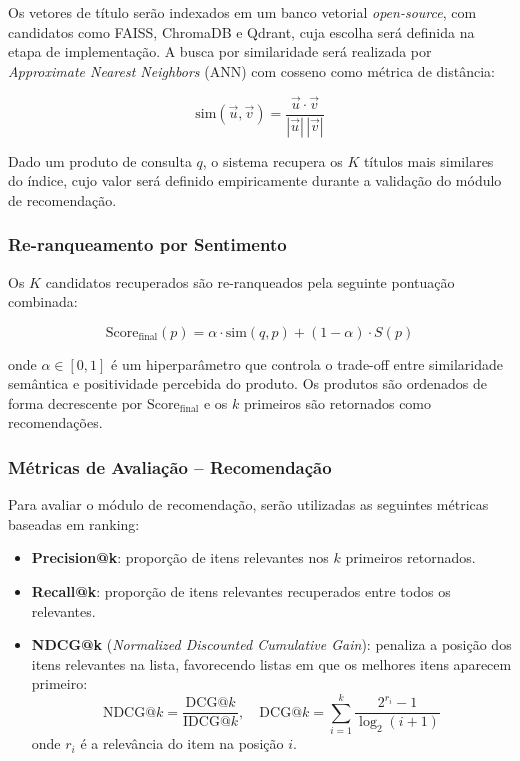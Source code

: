 \documentclass{IEEEtran}
\begin{document}
Os vetores de título serão indexados em um banco vetorial \textit{open-source}, com candidatos como FAISS, ChromaDB e Qdrant, cuja escolha será definida na etapa de implementação. A busca por similaridade será realizada por \textit{Approximate Nearest Neighbors} (ANN) com cosseno como métrica de distância:

\begin{equation}
  \text{sim}(\vec{u}, \vec{v}) = \frac{\vec{u} \cdot \vec{v}}{|\vec{u}|\, |\vec{v}|}
  \label{eq:cosine}
\end{equation}

Dado um produto de consulta $q$, o sistema recupera os $K$ títulos mais similares do índice, cujo valor será definido empiricamente durante a validação do módulo de recomendação.

\subsubsection{Re-ranqueamento por Sentimento}
\label{subsubsec:reranking}

Os $K$ candidatos recuperados são re-ranqueados pela seguinte pontuação combinada:

\begin{equation}
  \text{Score}_{\text{final}}(p) = \alpha \cdot \text{sim}(q, p) + (1 - \alpha) \cdot S(p)
  \label{eq:reranking}
\end{equation}

onde $\alpha \in [0, 1]$ é um hiperparâmetro que controla o trade-off entre similaridade semântica e positividade percebida do produto. Os produtos são ordenados de forma decrescente por $\text{Score}_{\text{final}}$ e os $k$ primeiros são retornados como recomendações.

\subsubsection{Métricas de Avaliação -- Recomendação}
\label{subsubsec:metrics_recomendation}

Para avaliar o módulo de recomendação, serão utilizadas as seguintes métricas baseadas em ranking:

\begin{itemize}[noitemsep]
  \item \textbf{Precision@k}: proporção de itens relevantes nos $k$ primeiros retornados.
  \item \textbf{Recall@k}: proporção de itens relevantes recuperados entre todos os relevantes.
  \item \textbf{NDCG@k} (\textit{Normalized Discounted Cumulative Gain}): penaliza a posição dos itens relevantes na lista, favorecendo listas em que os melhores itens aparecem primeiro:
    \begin{equation}
      \text{NDCG}@k = \frac{\text{DCG}@k}{\text{IDCG}@k}, \quad \text{DCG}@k = \sum_{i=1}^{k} \frac{2^{r_i}-1}{\log_2(i+1)}
      \label{eq:ndcg}
    \end{equation}
    onde $r_i$ é a relevância do item na posição $i$.
\end{itemize}
\end{document}
